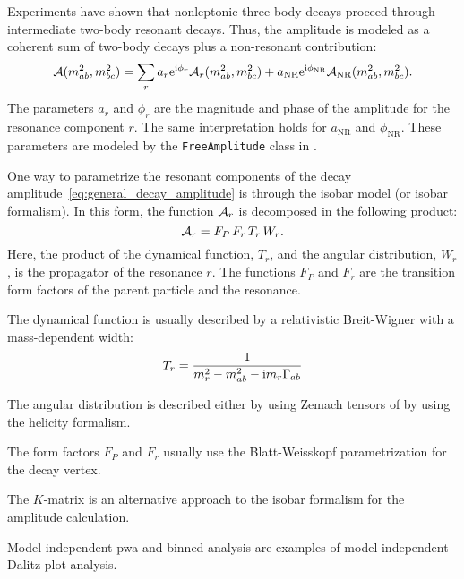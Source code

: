 Experiments have shown that nonleptonic three-body decays proceed through intermediate two-body resonant decays.
Thus, the amplitude is modeled as a coherent sum of two-body decays plus a non-resonant contribution:
\begin{equation}\label{eq:general_decay_amplitude}
    \mathcal{A}(m_{ab}^2, m_{bc}^2) = \sum_r a_r \mathrm{e}^{\mathrm{i}\phi_r}\mathcal{A}_r(m_{ab}^2,m_{bc}^2)
    + a_{\textup{NR}} \mathrm{e}^{\mathrm{i} \phi_{\textup{NR}}} \mathcal{A}_{\textup{NR}}(m_{ab}^2,m_{bc}^2).
\end{equation}
The parameters $a_r$ and $\phi_r$ are the magnitude and phase of the amplitude for the resonance component $r$.
The same interpretation holds for $a_\text{NR}$ and $\phi_\text{NR}$.
These parameters are modeled by the \lstinline!FreeAmplitude! class in .


One way to parametrize the resonant components of the decay amplitude~\eqref{eq:general_decay_amplitude} is through the isobar model (or isobar formalism).
In this form, the function $\mathcal{A}_r$ is decomposed in the following product:
\begin{equation}
    \mathcal{A}_r = F_P\,F_r\, T_r\, W_r.
\end{equation}
Here, the product of the dynamical function, $T_r$, and the angular distribution, $W_r$, is the propagator of the resonance $r$.
The functions $F_P$ and $F_r$ are the transition form factors of the parent particle and the resonance.

The dynamical function is usually described by a relativistic Breit-Wigner with a mass-dependent width:
\begin{equation}
    T_r = \frac{1}{m_r^2 - m_{ab}^2 - \mathrm{i} m_r \Gamma_{ab}}
\end{equation}

The angular distribution is described either by using Zemach tensors of by using the helicity formalism.


The form factors $F_P$ and $F_r$ usually use the Blatt-Weisskopf parametrization for the decay vertex.


The $K$-matrix is an alternative approach to the isobar formalism for the amplitude calculation.


Model independent \gls{pwa} and binned analysis are examples of model independent Dalitz-plot analysis.
